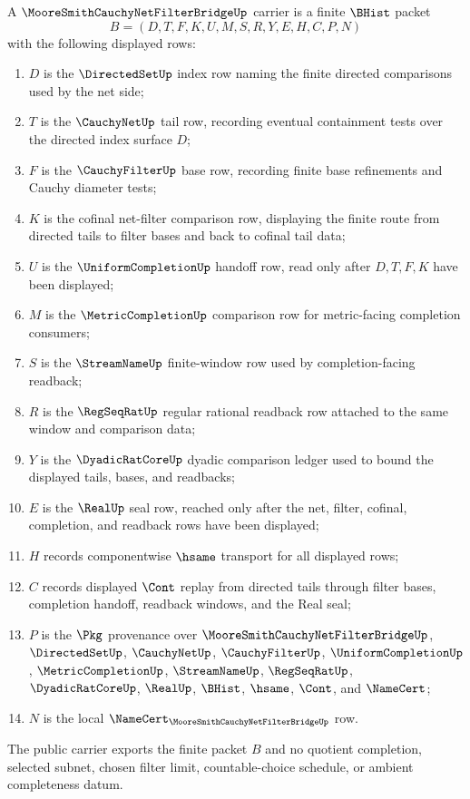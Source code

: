 \begin{definition}
\label{def:moore-smith-cauchy-net-filter-bridge-carrier}
A $\MooreSmithCauchyNetFilterBridgeUp$ carrier is a finite $\BHist$ packet
$$
B=(D,T,F,K,U,M,S,R,Y,E,H,C,P,N)
$$
with the following displayed rows:
\begin{enumerate}
\item $D$ is the $\DirectedSetUp$ index row naming the finite directed comparisons used by the net side;
\item $T$ is the $\CauchyNetUp$ tail row, recording eventual containment tests over the directed index surface $D$;
\item $F$ is the $\CauchyFilterUp$ base row, recording finite base refinements and Cauchy diameter tests;
\item $K$ is the cofinal net-filter comparison row, displaying the finite route from directed tails to filter bases and back to cofinal tail data;
\item $U$ is the $\UniformCompletionUp$ handoff row, read only after $D,T,F,K$ have been displayed;
\item $M$ is the $\MetricCompletionUp$ comparison row for metric-facing completion consumers;
\item $S$ is the $\StreamNameUp$ finite-window row used by completion-facing readback;
\item $R$ is the $\RegSeqRatUp$ regular rational readback row attached to the same window and comparison data;
\item $Y$ is the $\DyadicRatCoreUp$ dyadic comparison ledger used to bound the displayed tails, bases, and readbacks;
\item $E$ is the $\RealUp$ seal row, reached only after the net, filter, cofinal, completion, and readback rows have been displayed;
\item $H$ records componentwise $\hsame$ transport for all displayed rows;
\item $C$ records displayed $\Cont$ replay from directed tails through filter bases, completion handoff, readback windows, and the Real seal;
\item $P$ is the $\Pkg$ provenance over $\MooreSmithCauchyNetFilterBridgeUp$, $\DirectedSetUp$, $\CauchyNetUp$, $\CauchyFilterUp$, $\UniformCompletionUp$, $\MetricCompletionUp$, $\StreamNameUp$, $\RegSeqRatUp$, $\DyadicRatCoreUp$, $\RealUp$, $\BHist$, $\hsame$, $\Cont$, and $\NameCert$;
\item $N$ is the local $\NameCert_{\MooreSmithCauchyNetFilterBridgeUp}$ row.
\end{enumerate}
The public carrier exports the finite packet $B$ and no quotient completion, selected subnet, chosen filter limit, countable-choice schedule, or ambient completeness datum.
\end{definition}

